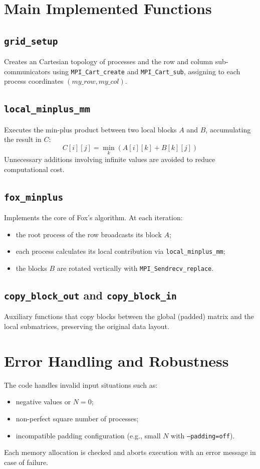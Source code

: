 \documentclass[10pt,a4paper]{article}
\begin{document}
\section{Main Implemented Functions}

\subsection{\texttt{grid\_setup}}
Creates an Cartesian topology of processes and the row and column sub-communicators using \texttt{MPI\_Cart\_create} and \texttt{MPI\_Cart\_sub}, 
assigning to each process coordinates \((my\_row, my\_col)\).

\subsection{\texttt{local\_minplus\_mm}}
Executes the min-plus product between two local blocks \(A\) and \(B\), accumulating the result in \(C\):
\[
C[i][j] = \min_k(A[i][k] + B[k][j])
\]
Unnecessary additions involving infinite values are avoided to reduce computational cost.

\subsection{\texttt{fox\_minplus}}
Implements the core of Fox's algorithm.  
At each iteration:
\begin{itemize}
  \item the root process of the row broadcasts its block \(A\);
  \item each process calculates its local contribution via \texttt{local\_minplus\_mm};
  \item the blocks \(B\) are rotated vertically with \texttt{MPI\_Sendrecv\_replace}.
\end{itemize}

\subsection{\texttt{copy\_block\_out} and \texttt{copy\_block\_in}}
Auxiliary functions that copy blocks between the global (padded) matrix and the local submatrices, preserving the original data layout.

\section{Error Handling and Robustness}
The code handles invalid input situations such as:
\begin{itemize}
  \item negative values or \(N = 0\);
  \item non-perfect square number of processes;
  \item incompatible padding configuration (e.g., small \(N\) with \texttt{--padding=off}).
\end{itemize}
Each memory allocation is checked and aborts execution with an error message in case of failure.
\end{document}
